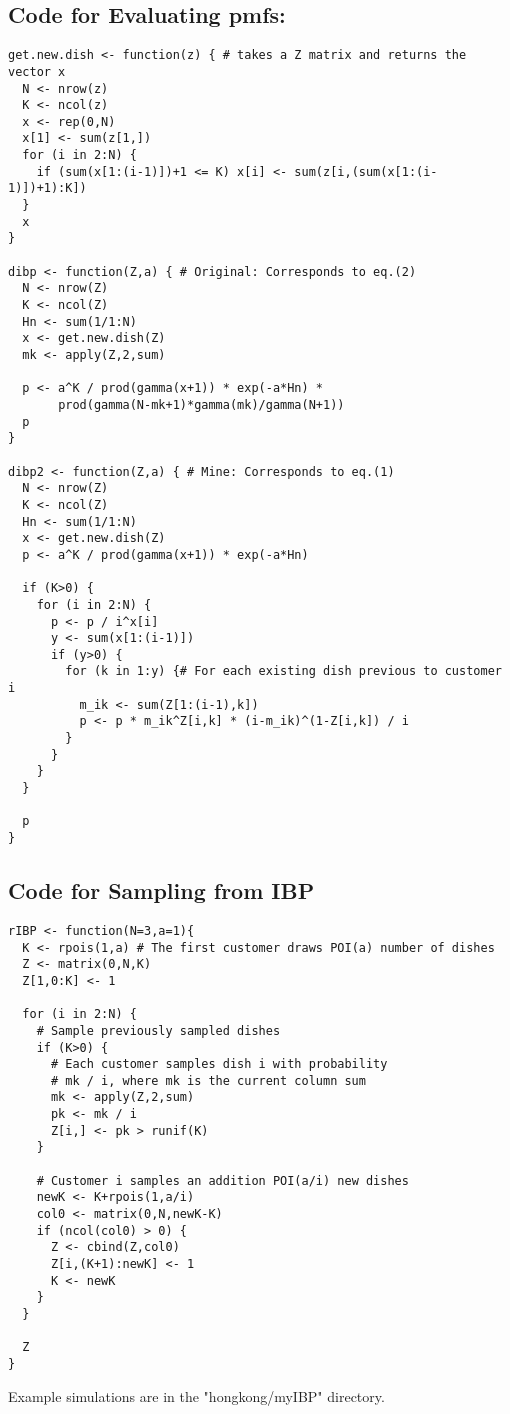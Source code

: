 \documentclass{article}
\begin{document}
\subsection{Code for Evaluating pmfs:}
\begin{verbatim}
get.new.dish <- function(z) { # takes a Z matrix and returns the vector x
  N <- nrow(z)
  K <- ncol(z)
  x <- rep(0,N)
  x[1] <- sum(z[1,])
  for (i in 2:N) {
    if (sum(x[1:(i-1)])+1 <= K) x[i] <- sum(z[i,(sum(x[1:(i-1)])+1):K])
  }
  x
}

dibp <- function(Z,a) { # Original: Corresponds to eq.(2)
  N <- nrow(Z)
  K <- ncol(Z)
  Hn <- sum(1/1:N)
  x <- get.new.dish(Z)
  mk <- apply(Z,2,sum)
  
  p <- a^K / prod(gamma(x+1)) * exp(-a*Hn) *
       prod(gamma(N-mk+1)*gamma(mk)/gamma(N+1))
  p
}

dibp2 <- function(Z,a) { # Mine: Corresponds to eq.(1)
  N <- nrow(Z)
  K <- ncol(Z)
  Hn <- sum(1/1:N)
  x <- get.new.dish(Z)
  p <- a^K / prod(gamma(x+1)) * exp(-a*Hn)

  if (K>0) {
    for (i in 2:N) {
      p <- p / i^x[i]
      y <- sum(x[1:(i-1)])
      if (y>0) {
        for (k in 1:y) {# For each existing dish previous to customer i
          m_ik <- sum(Z[1:(i-1),k])
          p <- p * m_ik^Z[i,k] * (i-m_ik)^(1-Z[i,k]) / i
        }
      }
    }
  }

  p
}
\end{verbatim}

\newpage
\subsection{Code for Sampling from IBP}
\begin{verbatim}
rIBP <- function(N=3,a=1){
  K <- rpois(1,a) # The first customer draws POI(a) number of dishes
  Z <- matrix(0,N,K)
  Z[1,0:K] <- 1
  
  for (i in 2:N) {
    # Sample previously sampled dishes
    if (K>0) {
      # Each customer samples dish i with probability
      # mk / i, where mk is the current column sum
      mk <- apply(Z,2,sum) 
      pk <- mk / i
      Z[i,] <- pk > runif(K) 
    } 

    # Customer i samples an addition POI(a/i) new dishes
    newK <- K+rpois(1,a/i)
    col0 <- matrix(0,N,newK-K)
    if (ncol(col0) > 0) {
      Z <- cbind(Z,col0)
      Z[i,(K+1):newK] <- 1
      K <- newK
    }
  }

  Z
}
\end{verbatim}

Example simulations are in the "hongkong/myIBP" directory.
\end{document}
